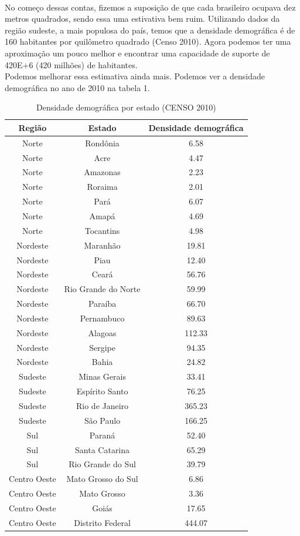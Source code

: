 \documentclass[a4paper]{article}
\begin{document}
\\
No come\c{c}o dessas contas, fizemos a suposi\c{c}\~{a}o de que cada brasileiro ocupava dez metros quadrados, sendo essa uma estivativa bem ruim. Utilizando dados da regi\~{a}o sudeste, a mais populosa do pa\'{i}s, temos que a densidade demogr\'{a}fica \'{e} de 160 habitantes por quil\^{o}metro quadrado (Censo 2010). Agora podemos ter uma aproxima\c{c}\~{a}o um pouco melhor e encontrar uma capacidade de suporte de 420E+6 (420 milh\~{o}es) de habitantes.
\\
Podemos melhorar essa estimativa ainda mais. Podemos ver a densidade demogr\'{a}fica no ano de 2010 na tabela 1.
\\
\begin{table}[ht!]
\centering
\caption{Densidade demogr\'{a}fica por estado (CENSO 2010)}
\label{tabelaCensoDem2010}
\begin{tabular}{c|c|c}
Regi\~{a}o		&	Estado				&	Densidade demogr\'{a}fica\\
\hline
Norte		&	Rond\^{o}nia		& 	6.58		\\
Norte		&	Acre			&	4.47		\\
Norte		&	Amazonas 		&	2.23		\\
Norte		&	Roraima			&	2.01		\\
Norte		&	Par\'{a} 		&	6.07		\\
Norte		&	Amap\'{a}		&	4.69		\\
Norte		&	Tocantins		&	4.98		\\
Nordeste	&	Maranh\~{a}o 		&	19.81 		\\
Nordeste	&	Piau			&	12.40		\\
Nordeste	&	Cear\'{a}		&	56.76 		\\
Nordeste	&	Rio Grande do Norte	&	59.99 		\\
Nordeste	&	Para\'{i}ba		&	66.70 		\\
Nordeste	&	Pernambuco		&	89.63 		\\
Nordeste	&	Alagoas			&	112.33		\\
Nordeste	&	Sergipe			&	94.35		\\
Nordeste	&	Bahia			&	24.82		\\
Sudeste		&	Minas Gerais		&	33.41 		\\
Sudeste		&	Esp\'{i}rito Santo	&	76.25 		\\
Sudeste		&	Rio de Janeiro		&	365.23  	\\
Sudeste		&	S\~{a}o Paulo		&	166.25  	\\
Sul			&	Paran\'{a}		&	52.40		\\
Sul			&	Santa Catarina		&	65.29		\\
Sul			&	Rio Grande do Sul	&	39.79		\\	
Centro Oeste	& 	Mato Grosso do Sul	&	6.86   		\\
Centro Oeste	& 	Mato Grosso		&	3.36   		\\
Centro Oeste	& 	Goi\'{a}s		&	17.65  		\\
Centro Oeste	& 	Distrito Federal	&	444.07	
\end{tabular}
\end{table}
\end{document}
